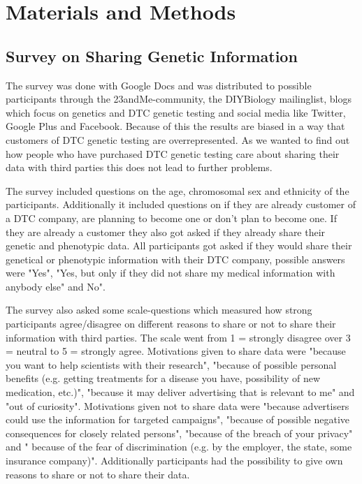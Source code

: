 \documentclass[10pt]{article}
\begin{document}
\section*{Materials and Methods}
\subsection*{Survey on Sharing Genetic Information}
The survey was done with Google Docs and was distributed to possible participants through the 23andMe-community, the DIYBiology mailinglist, blogs which focus on genetics and DTC genetic testing and social media like Twitter, Google Plus and Facebook. Because of this the results are biased in a way that customers of DTC genetic testing are overrepresented. As we wanted to find out how people who have purchased DTC genetic testing care about sharing their data with third parties this does not lead to further problems. 

The survey included questions on the age, chromosomal sex and ethnicity of the participants. Additionally it included questions on if they are already customer of a DTC company, are planning to become one or don't plan to become one. If they are already a customer they also got asked if they already share their genetic and phenotypic data. All participants got asked if they would share their genetical or phenotypic information with their DTC company, possible answers were "Yes", "Yes, but only if they did not share my medical information with anybody else" and No". 

The survey also asked some scale-questions which measured how strong participants agree/disagree on different reasons to share or not to share their information with third parties. The scale went from 1 = strongly disagree over 3 = neutral to  5 = strongly agree. Motivations given to share data were "because you want to help scientists with their research", "because of possible personal benefits (e.g. getting treatments for a disease you have, possibility of new medication, etc.)", "because it may deliver advertising that is relevant to me" and "out of curiosity". Motivations given not to share data were "because advertisers could use the information for targeted campaigns", "because of possible negative consequences for closely related persons", "because of the breach of your privacy" and " because of the fear of discrimination (e.g. by the employer, the state, some insurance company)". Additionally participants had the possibility to give own reasons to share or not to share their data.
\end{document}
